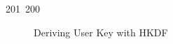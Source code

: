 201~200~\documentclass{article}
\begin{document}
\begin{figure}[h]
	                                                                                                                                                                                                                                                                                                	                                                                                                                                        	    	                                                                                                	                                                                                                                                                                                                                                                                                                    \caption{Deriving User Key with HKDF}
	                                                                                                                                                                                                                                                                                                	                                                                                                                                        	    	                                                                                                	                                                                                                                                                                                                                                                                                                        \label{fig:userkey-hkdf}
	                                                                                                                                                                                                                                                                                                	                                                                                                                                        	    	                                                                                                	                                                                                                                                                                                                                                                                                                        \end{figure}
\end{document}
